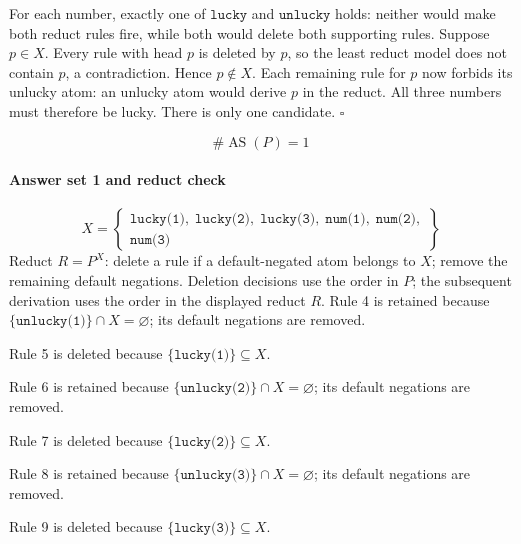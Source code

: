 \documentclass[a4paper,11pt]{article}
\newif\ifexplain
\newcommand{\explain}[1]{\ifexplain\begin{erklbox}#1\end{erklbox}\fi}
\newcommand{\at}[1]{\texttt{#1}}
\begin{document}
\explain{Die PDF schreibt die Fälle für 1, 2 und 3 einzeln aus, damit die Nummern im Beweis passen. In \texttt{clingo/1\_4b.lp} liefern die drei \texttt{num}-Fakten dieselben Zahlen; drei Variablenregeln ersetzen die wiederholten Einzelregeln. \texttt{p} schließt alle Fälle mit einem \texttt{unlucky} aus. Übrig bleibt nur, dass alle drei Zahlen \texttt{lucky} sind.}
For each number, exactly one of $\at{lucky}$ and $\at{unlucky}$ holds: neither would make both reduct rules fire, while both would delete both supporting rules. Suppose $p\in X$. Every rule with head $p$ is deleted by $p$, so the least reduct model does not contain $p$, a contradiction. Hence $p\notin X$. Each remaining rule for $p$ now forbids its unlucky atom: an unlucky atom would derive $p$ in the reduct. All three numbers must therefore be lucky. There is only one candidate. $\square$
\explain{Zuerst klären wir, welche Kombinationen überhaupt möglich sind. Gegenseitige Default-Negation lässt genau eine der beiden Eigenschaften zu. Eine Regel mit \texttt{not p} und Kopf $p$ kann einen Fall ausschließen, statt einfach $p$ zu einer stabilen Lösung hinzuzufügen. Die Redukt-Proben darunter prüfen jede verbliebene Kombination einzeln.}
\[
\boxed{\#\operatorname{AS}(P)=1}
\]
\paragraph{Answer set 1 and reduct check}
\[
X=\left\{\begin{gathered}\at{lucky(1)},\;\at{lucky(2)},\;\at{lucky(3)},\;\at{num(1)},\;\at{num(2)},\\\at{num(3)}\end{gathered}\right\}
\]
Reduct $R=P^X$: delete a rule if a default-negated atom belongs to $X$; remove the remaining default negations. Deletion decisions use the order in $P$; the subsequent derivation uses the order in the displayed reduct $R$.
Rule 4 is retained because $\{\at{unlucky(1)}\}\cap X=\varnothing$; its default negations are removed.

Rule 5 is deleted because $\{\at{lucky(1)}\}\subseteq X$.

Rule 6 is retained because $\{\at{unlucky(2)}\}\cap X=\varnothing$; its default negations are removed.

Rule 7 is deleted because $\{\at{lucky(2)}\}\subseteq X$.

Rule 8 is retained because $\{\at{unlucky(3)}\}\cap X=\varnothing$; its default negations are removed.

Rule 9 is deleted because $\{\at{lucky(3)}\}\subseteq X$.
\end{document}
